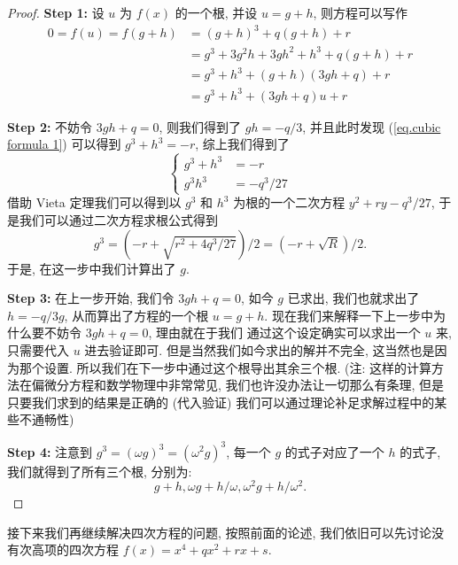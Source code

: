 \documentclass[UTF8]{book}
\begin{document}
\begin{proof}
    \textbf{Step 1:} 设 $u$ 为 $f(x)$ 的一个根, 并设 $u= g+h$, 
    则方程可以写作
    \begin{equation}\label{eq.cubic formula 1}
        \begin{aligned}
            0 = f(u) = f(g+h) &= (g+h)^3 + q(g+h) +r \\
            &= g^3 + 3g^2h + 3gh^2 + h^3 + q(g+h) +r \\
            &= g^3 + h^3 + (g+h)(3gh+q) +r \\
            &= g^3 + h^3 +(3gh+q)u + r
        \end{aligned}
    \end{equation}

    \textbf{Step 2:} 不妨令 $3gh+q = 0$, 则我们得到了 $gh = -q/3$, 
    并且此时发现 (\ref{eq.cubic formula 1}) 可以得到 $g^3+h^3 = -r$, 
    综上我们得到了
    \begin{equation}
        \begin{cases}
            g^3+h^3 &= -r \\
            g^3 h^3 &=-q^3/27
        \end{cases}
    \end{equation}
    借助 Vieta 定理我们可以得到以 $g^3$ 和 $h^3$ 为根的一个二次方程 
    $ y^2 +ry -q^3/27 $, 于是我们可以通过二次方程求根公式得到
    $$ g^3  = (-r + \sqrt{ r^2 + 4q^3/27})/2 =(-r + \sqrt{R})/2. $$
    于是, 在这一步中我们计算出了 $g$. 

    \textbf{Step 3:} 在上一步开始, 我们令 $3gh+q=0$, 如今 $g$ 已求出, 
    我们也就求出了 $h = -q/3g$, 从而算出了方程的一个根 $u=g+h$. 
    现在我们来解释一下上一步中为什么要不妨令 $3gh+q=0$, 理由就在于我们
    通过这个设定确实可以求出一个 $u$ 来,只需要代入 $u$ 进去验证即可. 
    但是当然我们如今求出的解并不完全, 
    这当然也是因为那个设置. 所以我们在下一步中通过这个根导出其余三个根. 
     (注: 这样的计算方法在偏微分方程和数学物理中非常常见,
     我们也许没办法让一切那么有条理, 但是只要我们求到的结果是正确的 
     (代入验证) 我们可以通过理论补足求解过程中的某些不通畅性)

    \textbf{Step 4:} 注意到 $g^3 = (\omega g)^3 = (\omega^2 g)^3$,
    每一个 $g$ 的式子对应了一个 $h$ 的式子, 我们就得到了所有三个根, 
    分别为: 
    $$ g+h, \omega g + h/\omega , \omega^2 g + h/\omega^2. $$
\end{proof}

接下来我们再继续解决四次方程的问题, 按照前面的论述, 
我们依旧可以先讨论没有次高项的四次方程 
$ f(x)=x^4 + qx^2 + rx + s $. 
\end{document}
